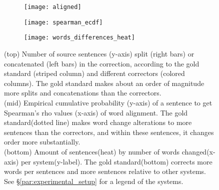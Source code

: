 	
	\begin{figure}[tbp]
		\centering
		\begin{subfigure}[]{0.4\textwidth}
			\texttt{[image: aligned]}
		\end{subfigure}
		
		\begin{subfigure}[]{0.4\textwidth}
			\com{\caption{\label{fig:rho}}}
			\texttt{[image: spearman\_ecdf]}
		\end{subfigure}
		
		\begin{subfigure}[]{0.4\textwidth}
			\texttt{[image: words\_differences\_heat]}
		\end{subfigure}
		\caption{(top) Number of source sentences (y-axis) split 
			(right bars) or concatenated (left bars) in the correction, according to the gold standard (striped column) and different correctors (colored columns). The gold standard makes about an order of magnitude more splits and concatenations than the correctors.\\
			(mid) Empirical cumulative probability (y-axis) of a sentence to get Spearman's rho values (x-axis) of word alignment. The gold standard(dotted line) makes word change alterations to more sentences than the correctors, and within these sentences, it changes order more substantially.\\
			(bottom) Amount of sentences(heat) by number of words changed(x-axis) per system(y-label). The gold standard(bottom) corrects more words per sentences and more sentences relative to other systems.\\
			See \S\ref{par:experimental_setup} for a legend
			of the systems.\label{fig:over-conservatism}}
		

\end{figure}
